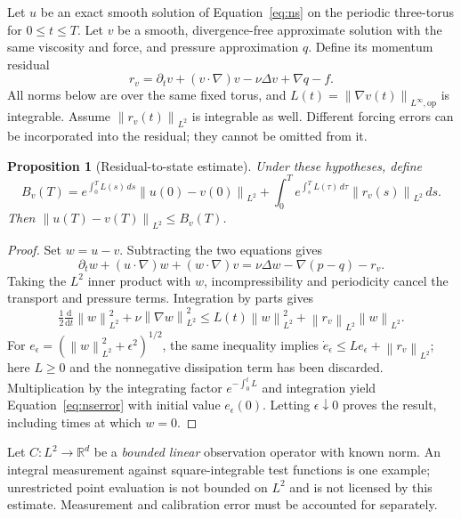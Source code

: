 \documentclass[11pt,a4paper]{article}
\newtheorem{proposition}[theorem]{Proposition}
\theoremstyle{definition}
\theoremstyle{remark}
\newcommand{\R}{\mathbb{R}}
\newcommand{\norm}[1]{\left\lVert#1\right\rVert}
\begin{document}
Let $u$ be an exact smooth solution of Equation~\eqref{eq:ns} on the periodic three-torus for $0\leq t\leq T$. Let $v$ be a smooth, divergence-free approximate solution with the same viscosity and force, and pressure approximation $q$. Define its momentum residual
\begin{equation}\label{eq:nsresidual}
 r_v=\partial_t v+(v\cdot\nabla)v-\nu\Delta v+\nabla q-f.
\end{equation}
All norms below are over the same fixed torus, and $L(t)=\norm{\nabla v(t)}_{L^\infty,\mathrm{op}}$ is integrable. Assume $\norm{r_v(t)}_{L^2}$ is integrable as well. Different forcing errors can be incorporated into the residual; they cannot be omitted from it.

\begin{proposition}[Residual-to-state estimate]\label{prop:nsresidual}
Under these hypotheses, define
\begin{equation}\label{eq:nserror}
 B_v(T)=e^{\int_0^T L(s)\,ds}\norm{u(0)-v(0)}_{L^2}
 +\int_0^T e^{\int_s^T L(\tau)\,d\tau}\norm{r_v(s)}_{L^2}\,ds.
\end{equation}
Then $\norm{u(T)-v(T)}_{L^2}\leq B_v(T)$.
\end{proposition}
\begin{proof}
Set $w=u-v$. Subtracting the two equations gives
\[
 \partial_t w+(u\cdot\nabla)w+(w\cdot\nabla)v
 =\nu\Delta w-\nabla(p-q)-r_v.
\]
Taking the $L^2$ inner product with $w$, incompressibility and periodicity cancel the transport and pressure terms. Integration by parts gives
\[
 \tfrac12\tfrac{\mathrm d}{\mathrm dt}\norm{w}_{L^2}^{2}
 +\nu\norm{\nabla w}_{L^2}^{2}
 \leq L(t)\norm{w}_{L^2}^{2}+\norm{r_v}_{L^2}\norm{w}_{L^2}.
\]
For $e_\epsilon=(\norm{w}_{L^2}^2+\epsilon^2)^{1/2}$, the same inequality implies
$\dot e_\epsilon\leq L e_\epsilon+\norm{r_v}_{L^2}$; here $L\geq0$ and the nonnegative dissipation term has been discarded. Multiplication by the integrating factor $e^{-\int_0^tL}$ and integration yield Equation~\eqref{eq:nserror} with initial value $e_\epsilon(0)$. Letting $\epsilon\downarrow0$ proves the result, including times at which $w=0$.
\end{proof}

Let $C:L^2\to\R^d$ be a \emph{bounded linear} observation operator with known norm. An integral measurement against square-integrable test functions is one example; unrestricted point evaluation is not bounded on $L^2$ and is not licensed by this estimate. Measurement and calibration error must be accounted for separately.
\end{document}
